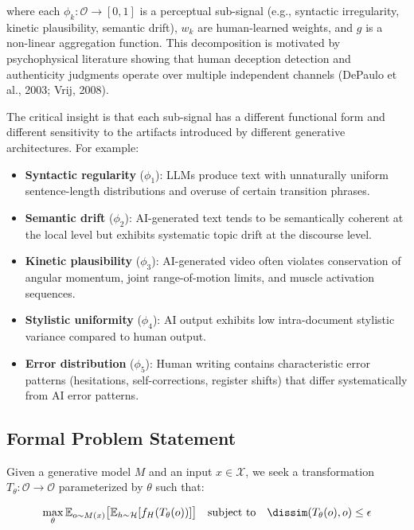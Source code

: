 \documentclass[12pt,oneside]{article}
\newcommand{\E}{\mathbb{E}}
\begin{document}
where each $\phi_k: \mathcal{O} \to [0, 1]$ is a perceptual sub-signal (e.g., syntactic irregularity, kinetic plausibility, semantic drift), $w_k$ are human-learned weights, and $g$ is a non-linear aggregation function. This decomposition is motivated by psychophysical literature showing that human deception detection and authenticity judgments operate over multiple independent channels (DePaulo et al., 2003; Vrij, 2008).

The critical insight is that each sub-signal has a different functional form and different sensitivity to the artifacts introduced by different generative architectures. For example:
\begin{itemize}[noitemsep]
    \item \textbf{Syntactic regularity} ($\phi_1$): LLMs produce text with unnaturally uniform sentence-length distributions and overuse of certain transition phrases.
    \item \textbf{Semantic drift} ($\phi_2$): AI-generated text tends to be semantically coherent at the local level but exhibits systematic topic drift at the discourse level.
    \item \textbf{Kinetic plausibility} ($\phi_3$): AI-generated video often violates conservation of angular momentum, joint range-of-motion limits, and muscle activation sequences.
    \item \textbf{Stylistic uniformity} ($\phi_4$): AI output exhibits low intra-document stylistic variance compared to human output.
    \item \textbf{Error distribution} ($\phi_5$): Human writing contains characteristic error patterns (hesitations, self-corrections, register shifts) that differ systematically from AI error patterns.
\end{itemize}

\subsection{Formal Problem Statement}

Given a generative model $M$ and an input $x \in \mathcal{X}$, we seek a transformation $T_\theta: \mathcal{O} \to \mathcal{O}$ parameterized by $\theta$ such that:

\begin{equation}
\max_{\theta} \E_{o \sim M(x)} \big[\E_{h \sim \mathcal{H}}[f_H(T_\theta(o))] \big]
\quad \text{subject to} \quad
\dissim(T_\theta(o), o) \leq \epsilon
\end{equation}
\end{document}
